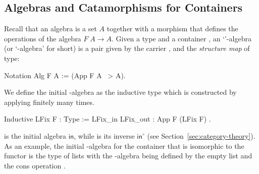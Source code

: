 \documentclass[a4paper,UKenglish,cleveref, autoref, thm-restate]{lipics-v2021}
\newcommand{\operator}[1]{\textsf{#1}}
\newcommand{\InOp}{\operator{in}^{\circ}}
\newcommand{\InIso}{\operator{in}}
\begin{document}
\subsection{Algebras and Catamorphisms for Containers}
\label{sec:coq-algebras}

Recall that an algebra is a set $A$ together with a morphism that defines the
operations of the algebra $F\;A \to A$.  Given a type  and a container
, an `'-algebra (or `-algebra' for short) is a pair
given by the carrier , and the \emph{structure map} of type:
\begin{coqcode}
Notation Alg F A := (App F A ~> A).
\end{coqcode}
We define the initial -algebra as the inductive type which is constructed
by applying  finitely many times.
\begin{coqcode}
Inductive LFix F : Type := LFix_in { LFix_out : App F (LFix F) }.
\end{coqcode}
 is the initial algebra $\InIso$, while  is its
inverse $\InOp$ (see Section~\ref{sec:category-theory}).  As an example, the
initial -algebra for the container that is isomorphic to the functor
 is the type of lists with the -algebra being
defined by the empty list  and the cons operation
.
\end{document}
